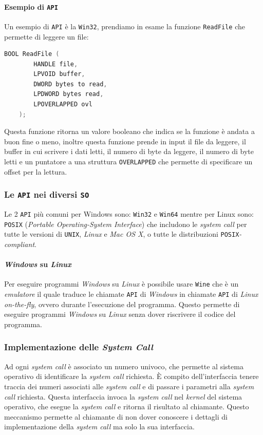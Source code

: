         \paragraph{Esempio di \texttt{API}} Un esempio di \texttt{API} è la \texttt{Win32}, prendiamo in esame la funzione \texttt{ReadFile} che permette di leggere un file:
\begin{lstlisting}[language=C]
    BOOL ReadFile (
        HANDLE file,
        LPVOID buffer,
        DWORD bytes to read,
        LPDWORD bytes read,
        LPOVERLAPPED ovl
    );
\end{lstlisting}
        Questa funzione ritorna un valore booleano che indica se la funzione è andata a buon fine o meno, inoltre questa funzione prende in input il file da leggere, il buffer in cui scrivere i dati letti, il numero di byte da leggere, il numero di byte letti e un puntatore a una struttura \texttt{OVERLAPPED} che permette di specificare un offset per la lettura.
        \subsubsection{Le \texttt{API} nei diversi \texttt{SO}}
            Le 2 \texttt{API} più comuni per Windows sono: \texttt{Win32} e \texttt{Win64} mentre per Linux sono: \texttt{POSIX} (\textit{Portable Operating-System Interface}) che includono le \textit{system call} per tutte le versioni di \texttt{UNIX}, \textit{Linux} e \textit{Mac OS X}, o tutte le distribuzioni \texttt{POSIX}\textit{-compliant}. 
            \paragraph{\textit{Windows} su \textit{Linux}} Per eseguire programmi \textit{Windows} su \textit{Linux} è possibile usare \texttt{Wine} che è un \textit{emulatore} il quale traduce le chiamate \texttt{API} di \textit{Windows} in chiamate \texttt{API} di \textit{Linux} \textit{on-the-fly}, ovvero durante l'esecuzione del programma. Questo permette di eseguire programmi \textit{Windows} su \textit{Linux} senza dover riscrivere il codice del programma.
        
        \subsubsection{Implementazione delle \textit{System Call}}
            Ad ogni \textit{system call} è associato un numero univoco, che permette al sistema operativo di identificare la \textit{system call} richiesta. È compito dell'interfaccia tenere traccia dei numeri associati alle \textit{system call} e di passare i parametri alla \textit{system call} richiesta. Questa interfaccia invoca la \textit{system call} nel \textit{kernel} del sistema operativo, che esegue la \textit{system call} e ritorna il risultato al chiamante. Questo meccanismo permette al chiamante di non dover conoscere i dettagli di implementazione della \textit{system call} ma solo la sua interfaccia.
